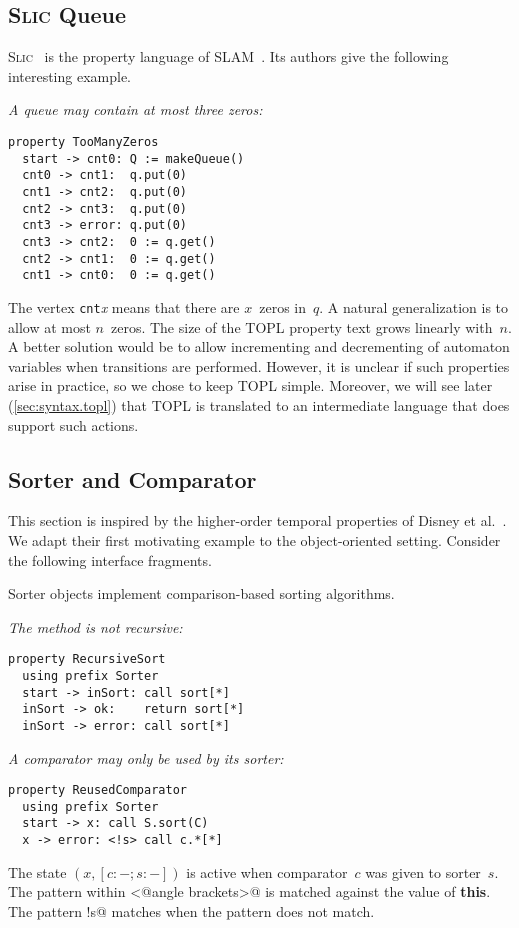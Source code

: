 \documentclass[preprint]{sigplanconf} %
\newcommand{\delimitVerbatim}{\par\nobreak\smallskip\noindent}
\theoremstyle{definition}
\theoremstyle{remark}
\begin{document}
\subsection{\textsc{Slic} Queue} %

\textsc{Slic}~\cite{ball2002} is the property language of SLAM~\cite{dblp:conf/cav/ballr01}.
Its authors give the following interesting example.

\medskip\emph{A queue may contain at most three zeros:}
\delimitVerbatim
\begin{Verbatim}
property TooManyZeros
  start -> cnt0: Q := makeQueue()
  cnt0 -> cnt1:  q.put(0)
  cnt1 -> cnt2:  q.put(0)
  cnt2 -> cnt3:  q.put(0)
  cnt3 -> error: q.put(0)
  cnt3 -> cnt2:  0 := q.get()
  cnt2 -> cnt1:  0 := q.get()
  cnt1 -> cnt0:  0 := q.get()
\end{Verbatim}
\delimitVerbatim
The vertex \texttt{cnt}\textit{x} means that there are $x$~zeros in~$q$.
A natural generalization is to allow at most $n$~zeros.
The size of the TOPL property text grows linearly with~$n$.
A better solution would be to allow incrementing and decrementing of automaton variables when transitions are performed.
However, it is unclear if such properties arise in practice, so we chose to keep TOPL simple.
Moreover, we will see later (\autoref{sec:syntax.topl}) that TOPL is translated to an intermediate language that does support such actions.

\subsection{Sorter and Comparator}\label{sec:examples.sorter} %

This section is inspired by the higher-order temporal properties of Disney et al.~\cite{disney2011}.
We adapt their first motivating example to the object-oriented setting.
Consider the following interface fragments.
\delimitVerbatim

\delimitVerbatim
Sorter objects implement comparison-based sorting algorithms.

\medskip\emph{The \Verb@sort@ method is not recursive:}
\delimitVerbatim
\begin{Verbatim}
property RecursiveSort
  using prefix Sorter
  start -> inSort: call sort[*]
  inSort -> ok:    return sort[*]
  inSort -> error: call sort[*]
\end{Verbatim}

\medskip\emph{A comparator may only be used by its sorter:}
\delimitVerbatim
\begin{Verbatim}
property ReusedComparator
  using prefix Sorter
  start -> x: call S.sort(C)
  x -> error: <!s> call c.*[*]
\end{Verbatim}
\delimitVerbatim
The state $(x,[c:-;s:-])$ is active when comparator~$c$ was given to sorter~$s$.
The pattern within \Verb@<@angle brackets\Verb@>@ is matched against the value of \textbf{this}.
The pattern \Verb@!s@ matches when the pattern \Verb@s@ does not match.
\end{document}
